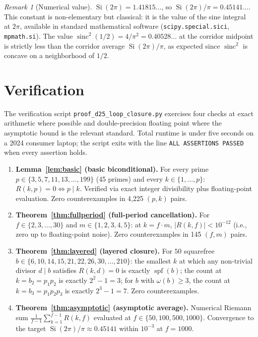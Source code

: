 \documentclass[11pt,reqno]{amsart}
\theoremstyle{plain}
\theoremstyle{definition}
\theoremstyle{remark}
\newtheorem{remark}[theorem]{Remark}
\DeclareMathOperator{\sinc}{sinc}
\DeclareMathOperator{\spf}{spf}
\DeclareMathOperator{\Si}{Si}
\begin{document}
\begin{remark}[Numerical value]
$\Si(2\pi) = 1.41815\ldots$, so $\Si(2\pi)/\pi = 0.45141\ldots$. This
constant is non-elementary but classical: it is the value of the sine
integral at $2\pi$, available in standard mathematical software
(\texttt{scipy.special.sici}, \texttt{mpmath.si}). The value
$\sinc^{2}(1/2) = 4/\pi^{2} = 0.40528\ldots$ at the corridor midpoint
is strictly less than the corridor average $\Si(2\pi)/\pi$, as
expected since $\sinc^{2}$ is concave on a neighborhood of $1/2$.
\end{remark}

\section{Verification}\label{sec:verify}

The verification script \texttt{proof\_d25\_loop\_closure.py}
exercises four checks at exact arithmetic where possible and
double-precision floating point where the asymptotic bound is the
relevant standard. Total runtime is under five seconds on a 2024
consumer laptop; the script exits with the line
\texttt{ALL ASSERTIONS PASSED} when every assertion holds.

\begin{enumerate}[label={\upshape(\arabic*)}]
\item \textbf{Lemma~\ref{lem:basic} (basic biconditional).} For every
prime $p \in \{3, 5, 7, 11, 13, \ldots, 199\}$ (45 primes) and every
$k \in \{1, \ldots, p\}$: $R(k, p) = 0 \iff p \mid k$. Verified via
exact integer divisibility plus floating-point evaluation. Zero
counterexamples in 4{,}225 $(p, k)$ pairs.

\item \textbf{Theorem~\ref{thm:fullperiod} (full-period cancellation).}
For $f \in \{2, 3, \ldots, 30\}$ and $m \in \{1, 2, 3, 4, 5\}$: at
$k = f \cdot m$, $|R(k, f)| < 10^{-12}$ (i.e., zero up to floating-point
noise). Zero counterexamples in 145 $(f, m)$ pairs.

\item \textbf{Theorem~\ref{thm:layered} (layered closure).} For $50$
squarefree $b \in \{6, 10, 14, 15, 21, 22, 26, 30, \ldots, 210\}$:
the smallest $k$ at which any non-trivial divisor $d \mid b$ satisfies
$R(k, d) = 0$ is exactly $\spf(b)$; the count at $k = b_{2} = p_{1}
p_{2}$ is exactly $2^{2} - 1 = 3$; for $b$ with $\omega(b) \ge 3$,
the count at $k = b_{3} = p_{1} p_{2} p_{3}$ is exactly $2^{3} - 1
= 7$. Zero counterexamples.

\item \textbf{Theorem~\ref{thm:asymptotic} (asymptotic average).}
Numerical Riemann sum $\frac{1}{f-1} \sum_{k=1}^{f-1} R(k, f)$
evaluated at $f \in \{50, 100, 500, 1000\}$. Convergence to the
target $\Si(2\pi)/\pi \approx 0.45141$ within $10^{-3}$ at $f = 1000$.
\end{enumerate}
\end{document}
